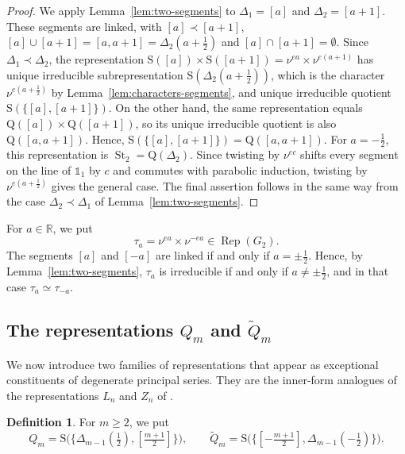 \documentclass[11pt]{amsart}
\numberwithin{equation}{section}
\theoremstyle{plain}
\theoremstyle{definition}
\newtheorem{definition}[theorem]{Definition}
\theoremstyle{remark}
\newcommand{\R}{\mathbb{R}}
\newcommand{\one}{\mathds{1}}
\DeclareMathOperator{\Rep}{Rep}
\DeclareMathOperator{\St}{St}
\newcommand{\Qt}{\widetilde{Q}}
\newcommand{\Ss}{\mathrm{S}}
\newcommand{\Qq}{\mathrm{Q}}
\begin{document}
\begin{proof}
	We apply Lemma~\ref{lem:two-segments} to $\Delta_1=[a]$ and $\Delta_2=[a+1]$. These segments are linked, with $[a]\prec[a+1]$, $[a]\cup[a+1]=[a,a+1]=\Delta_2(a+\frac12)$ and $[a]\cap[a+1]=\emptyset$. Since $\Delta_1\prec\Delta_2$, the representation $\Ss([a])\times\Ss([a+1])=\nu^{ea}\times\nu^{e(a+1)}$ has unique irreducible subrepresentation $\Ss(\Delta_2(a+\frac12))$, which is the character $\nu^{e(a+\frac12)}$ by Lemma~\ref{lem:characters-segments}, and unique irreducible quotient $\Ss(\{[a],[a+1]\})$. On the other hand, the same representation equals $\Qq([a])\times\Qq([a+1])$, so its unique irreducible quotient is also $\Qq([a,a+1])$. Hence, $\Ss(\{[a],[a+1]\})=\Qq([a,a+1])$. For $a=-\frac12$, this representation is $\St_2=\Qq(\Delta_2)$. Since twisting by $\nu^{ec}$ shifts every segment on the line of $\one_1$ by $c$ and commutes with parabolic induction, twisting by $\nu^{e(a+\frac12)}$ gives the general case. The final assertion follows in the same way from the case $\Delta_2\prec\Delta_1$ of Lemma~\ref{lem:two-segments}.
\end{proof}

For $a\in\R$, we put
\begin{equation}\label{eq:tau-a}
	\tau_a=\nu^{ea}\times\nu^{-ea}\in\Rep(G_2).
\end{equation}
The segments $[a]$ and $[-a]$ are linked if and only if $a=\pm\frac12$. Hence, by Lemma~\ref{lem:two-segments}, $\tau_a$ is irreducible if and only if $a\ne\pm\frac12$, and in that case $\tau_a\simeq\tau_{-a}$.

\subsection{The representations \texorpdfstring{$Q_m$}{Qm} and \texorpdfstring{$\widetilde Q_m$}{Q~m}}\label{ss:Qm}

We now introduce two families of representations that appear as exceptional constituents of degenerate principal series. They are the inner-form analogues of the representations $L_n$ and $Z_n$ of \cite[Definition 3.1]{Ven13}.

\begin{definition}\label{def:Qm}
	For $m\ge2$, we put
	$$
	Q_m=\Ss\big(\{\Delta_{m-1}(\tfrac12),[\tfrac{m+1}2]\}\big),\qquad \Qt_m=\Ss\big(\{[-\tfrac{m+1}2],\Delta_{m-1}(-\tfrac12)\}\big).
	$$
\end{definition}
\end{document}
